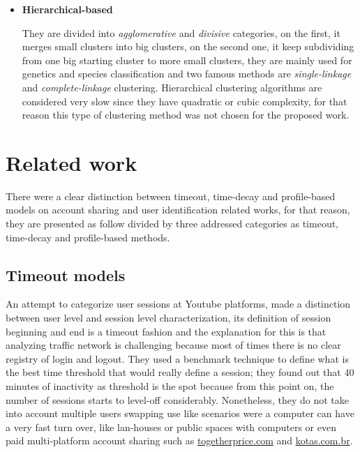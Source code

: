 \documentclass[ecp,tc,english]{iiufrgs}
\begin{document}
\begin{itemize}
            \item \textbf{Hierarchical-based}
            
            They are divided into \textit{agglomerative} and \textit{divisive} categories, on the first, it merges small clusters into big clusters, on the second one, it keep subdividing from one big starting cluster to more small clusters, they are mainly used for genetics and species classification and two famous methods are \textit{single-linkage} and \textit{complete-linkage} \cite{johnson1967, sibson1973} clustering. Hierarchical clustering algorithms are considered very slow since they have quadratic or cubic complexity, for that reason this type of clustering method was not chosen for the proposed work.
        \end{itemize}


\chapter{Related work} \label{related_works}
There were a clear distinction between timeout, time-decay and profile-based models on account sharing and user identification related works, for that reason, they are presented as follow divided by three addressed categories as timeout, time-decay and profile-based methods.

\section{Timeout models}

An attempt to categorize user sessions at Youtube platforms, \cite{gill2008} made a distinction between user level and session level characterization, its definition of session beginning and end is a timeout fashion and the explanation for this is that analyzing traffic network is challenging because most of times there is no clear registry of login and logout. They used a benchmark technique to define what is the best time threshold that would really define a session; they found out that 40 minutes of inactivity as threshold is the spot because from this point on, the number of sessions starts to level-off considerably.
Nonetheless, they do not take into account multiple users swapping use like scenarios were a computer can have a very fast turn over, like lan-houses or public spaces with computers or even paid multi-platform account sharing such as \url{togetherprice.com} and \url{kotas.com.br}.
\end{document}
